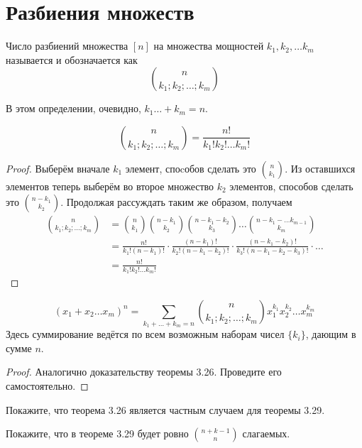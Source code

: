 \section{Разбиения множеств}

\begin{definition}
Число разбиений множества $[n]$ на множества мощностей $k_1, k_2, \ldots k_m$ называется  и обозначается как
$$n \choose k_1; k_2;\ldots; k_m$$
\end{definition}

В этом определении, очевидно, $k_1\ldots+ k_m = n$.

\begin{thm}
$${n \choose k_1; k_2;\ldots; k_m} = \frac{n!}{k_1!k_2!\ldots k_m!}$$
\end{thm}
\begin{proof}
Выберём вначале $k_1$ элемент, споcобов сделать это $n\choose k_1$. Из оставшихся элементов теперь выберём во второе множество $k_2$ элементов, способов сделать это $n-k_1\choose k_2$. Продолжая рассуждать таким же образом, получаем
\begin{align*}
{n \choose k_1; k_2;\ldots; k_m} & = {n\choose k_1}{n-k_1\choose k_2}{n-k_1-k_2\choose k_3}\ldots{n-k_1-\ldots k_{m-1}\choose k_m} \\
&= \frac{n!}{k_1!(n-k_1)!}\cdot\frac{(n-k_1)!}{k_2!(n-k_1-k_2)!}\cdot\frac{(n-k_1-k_2)!}{k_3!(n-k_1-k_2-k_3)!}\cdot\ldots\\
&=\frac{n!}{k_1!k_2!\ldots k_m!}
\end{align*}
\end{proof}

\begin{thm}
$$(x_1+x_2\ldots x_m)^n = \sum_{k_1+\ldots + k_m = n}{n\choose k_1;k_2;\ldots;k_m}x_1^{k_1}x_2^{k_2}\ldots x_m^{k_m}$$
Здесь суммирование ведётся по всем возможным наборам чисел $\{k_i\}$, дающим в сумме $n$.
\end{thm}
\begin{proof}
Аналогично доказательству теоремы 3.26. Проведите его самостоятельно.
\end{proof}

\begin{exercise}
Покажите, что теорема 3.26 является частным случаем для теоремы 3.29.
\end{exercise}

\begin{exercise}
Покажите, что в теореме 3.29 будет ровно $n + k - 1 \choose n$ слагаемых.
\end{exercise}

